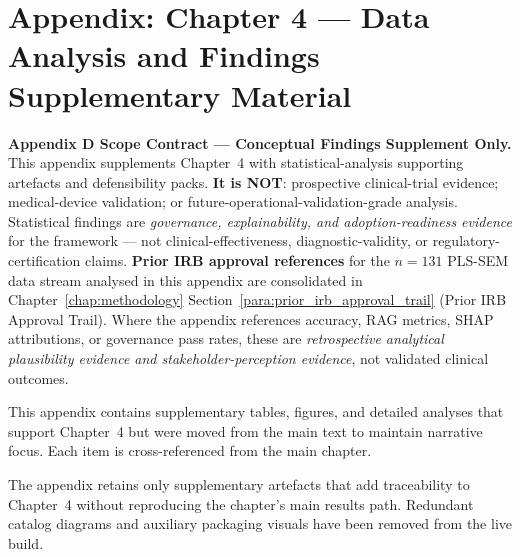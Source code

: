 
\chapter*{Appendix: Chapter 4 --- Data Analysis and Findings Supplementary Material}
\label{chap:appendix_ch4}
\label{app:ch4_support_appx}
\normalsize\normalfont\color{black}
\label{app:ch4_support}


\noindent\textbf{Appendix D Scope Contract --- Conceptual Findings Supplement Only.}
\label{para:appd_scope_contract}
This appendix supplements Chapter~4 with statistical-analysis supporting artefacts and defensibility packs. \textbf{It is NOT}: prospective clinical-trial evidence; medical-device validation; or future-operational-validation-grade analysis. Statistical findings are \emph{governance, explainability, and adoption-readiness evidence} for the framework --- not clinical-effectiveness, diagnostic-validity, or regulatory-certification claims. \textbf{Prior IRB approval references} for the $n{=}131$ PLS-SEM data stream analysed in this appendix are consolidated in Chapter~\ref{chap:methodology} Section~\ref{para:prior_irb_approval_trail} (Prior IRB Approval Trail). Where the appendix references accuracy, RAG metrics, SHAP attributions, or governance pass rates, these are \emph{retrospective analytical plausibility evidence and stakeholder-perception evidence}, not validated clinical outcomes.

This appendix contains supplementary tables, figures, and detailed analyses that support Chapter~4 but were moved from the main text to maintain narrative focus. Each item is cross-referenced from the main chapter.

\noindent The appendix retains only supplementary artefacts that add traceability to Chapter~4 without reproducing the chapter's main results path. Redundant catalog diagrams and auxiliary packaging visuals have been removed from the live build.


